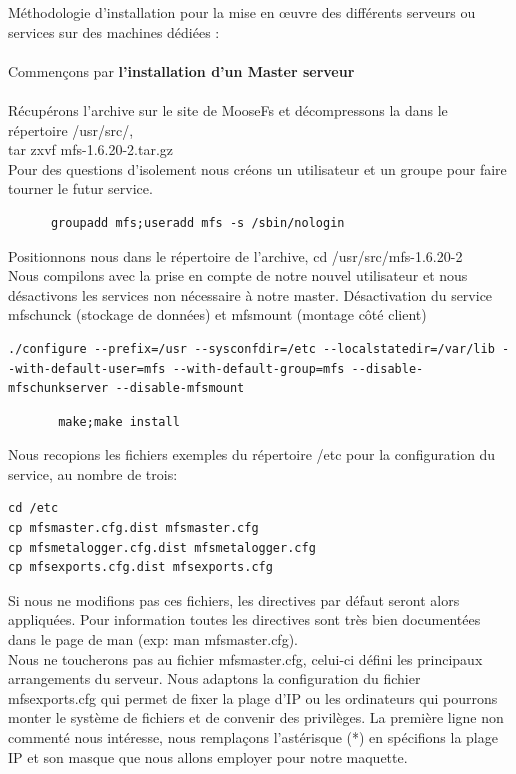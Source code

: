 \documentclass[12pt]{report}
\begin{document}
Méthodologie d'installation pour la mise en œuvre des différents serveurs ou services sur des machines dédiées :\\\\
Commençons par \textbf{l'installation d'un Master serveur}\\\\
Récupérons l'archive sur le site de MooseFs et décompressons la dans le répertoire /usr/src/,\\ tar zxvf mfs-1.6.20-2.tar.gz\\
Pour des questions d'isolement nous créons un utilisateur et un groupe pour faire tourner le futur service.\\
\begin{lstlisting}
	  groupadd mfs;useradd mfs -s /sbin/nologin
	  \end{lstlisting}
Positionnons nous dans le répertoire de l'archive, cd /usr/src/mfs-1.6.20-2\\
Nous compilons avec la prise en compte de notre nouvel utilisateur et nous désactivons les services non nécessaire à notre master.
Désactivation du service mfschunck (stockage de données) et mfsmount (montage côté client)
\begin{lstlisting}
./configure --prefix=/usr --sysconfdir=/etc --localstatedir=/var/lib --with-default-user=mfs --with-default-group=mfs --disable-mfschunkserver --disable-mfsmount
	  \end{lstlisting}
\begin{lstlisting}
	   make;make install
	  \end{lstlisting}
Nous recopions les fichiers exemples du répertoire /etc pour la configuration du service, au nombre de trois:
          \begin{lstlisting}
cd /etc
cp mfsmaster.cfg.dist mfsmaster.cfg
cp mfsmetalogger.cfg.dist mfsmetalogger.cfg
cp mfsexports.cfg.dist mfsexports.cfg
	  \end{lstlisting}
Si nous ne modifions pas ces fichiers, les directives par défaut seront alors appliquées.
Pour information toutes les directives sont très bien documentées dans le page de man (exp: man mfsmaster.cfg).\\
Nous ne toucherons pas au fichier mfsmaster.cfg, celui-ci défini les principaux arrangements du serveur.
Nous adaptons la configuration du fichier mfsexports.cfg qui permet de fixer la plage d'IP ou les ordinateurs qui pourrons monter le système de fichiers et de convenir des privilèges.
La première ligne non commenté nous intéresse, nous remplaçons l'astérisque (*) en spécifions la plage IP et son masque que nous allons employer pour notre maquette.
\end{document}
